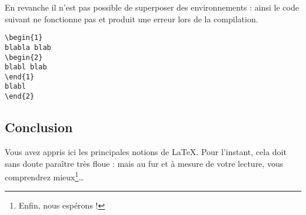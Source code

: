 En revanche il n'est pas possible de superposer des environnements : ainsi le code suivant ne fonctionne pas et produit une erreur lors de la compilation.


\begin{verbatim}
\begin{1}
blabla blab
\begin{2}
blabl blab
\end{1}
blabl
\end{2}
\end{verbatim}

\subsection{Conclusion}

Vous avez appris ici les principales notions de \LaTeX. Pour l'instant, cela doit sans doute paraître très floue : mais au fur et à mesure de votre lecture, vous comprendrez mieux\footnote{Enfin, nous espérons !}\ldots


